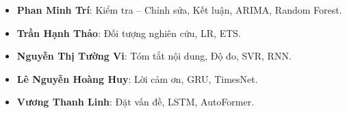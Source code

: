 \begin{itemize}
    \item \textbf{Phan Minh Trí}: Kiểm tra – Chỉnh sửa, Kết luận, ARIMA, Random Forest.
    \item \textbf{Trần Hạnh Thảo}: Đối tượng nghiên cứu, LR, ETS.
    \item \textbf{Nguyễn Thị Tường Vi}: Tóm tắt nội dung, Độ đo, SVR, RNN.
    \item \textbf{Lê Nguyễn Hoàng Huy}: Lời cảm ơn, GRU, TimesNet.
    \item \textbf{Vương Thanh Linh}: Đặt vấn đề, LSTM, AutoFormer.
\end{itemize}